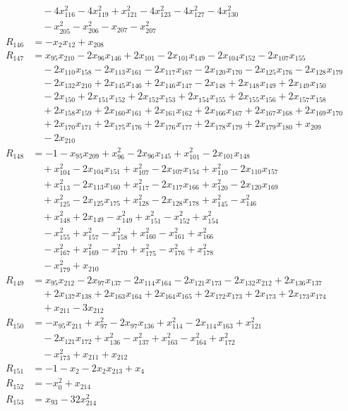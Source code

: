 \begin{align*}
&\quad{}-4x_{116}^{2}-4x_{119}^{2}+x_{121}^{2}-4x_{123}^{2}-4x_{127}^{2}-4x_{130}^{2}\\
&\quad{}-x_{205}^{2}-x_{206}^{2}-x_{207}-x_{207}^{2}\\
R_{146}&=-x_{2}x_{12}+x_{208}\\
R_{147}&=x_{95}x_{210}-2x_{96}x_{146}+2x_{101}-2x_{101}x_{149}-2x_{104}x_{152}-2x_{107}x_{155}\\
&\quad{}-2x_{110}x_{158}-2x_{113}x_{161}-2x_{117}x_{167}-2x_{120}x_{170}-2x_{125}x_{176}-2x_{128}x_{179}\\
&\quad{}-2x_{132}x_{210}+2x_{145}x_{146}+2x_{146}x_{147}-2x_{148}+2x_{148}x_{149}+2x_{149}x_{150}\\
&\quad{}-2x_{150}+2x_{151}x_{152}+2x_{152}x_{153}+2x_{154}x_{155}+2x_{155}x_{156}+2x_{157}x_{158}\\
&\quad{}+2x_{158}x_{159}+2x_{160}x_{161}+2x_{161}x_{162}+2x_{166}x_{167}+2x_{167}x_{168}+2x_{169}x_{170}\\
&\quad{}+2x_{170}x_{171}+2x_{175}x_{176}+2x_{176}x_{177}+2x_{178}x_{179}+2x_{179}x_{180}+x_{209}\\
&\quad{}-2x_{210}\\
R_{148}&=-1-x_{95}x_{209}+x_{96}^{2}-2x_{96}x_{145}+x_{101}^{2}-2x_{101}x_{148}\\
&\quad{}+x_{104}^{2}-2x_{104}x_{151}+x_{107}^{2}-2x_{107}x_{154}+x_{110}^{2}-2x_{110}x_{157}\\
&\quad{}+x_{113}^{2}-2x_{113}x_{160}+x_{117}^{2}-2x_{117}x_{166}+x_{120}^{2}-2x_{120}x_{169}\\
&\quad{}+x_{125}^{2}-2x_{125}x_{175}+x_{128}^{2}-2x_{128}x_{178}+x_{145}^{2}-x_{146}^{2}\\
&\quad{}+x_{148}^{2}+2x_{149}-x_{149}^{2}+x_{151}^{2}-x_{152}^{2}+x_{154}^{2}\\
&\quad{}-x_{155}^{2}+x_{157}^{2}-x_{158}^{2}+x_{160}^{2}-x_{161}^{2}+x_{166}^{2}\\
&\quad{}-x_{167}^{2}+x_{169}^{2}-x_{170}^{2}+x_{175}^{2}-x_{176}^{2}+x_{178}^{2}\\
&\quad{}-x_{179}^{2}+x_{210}\\
R_{149}&=x_{95}x_{212}-2x_{97}x_{137}-2x_{114}x_{164}-2x_{121}x_{173}-2x_{132}x_{212}+2x_{136}x_{137}\\
&\quad{}+2x_{137}x_{138}+2x_{163}x_{164}+2x_{164}x_{165}+2x_{172}x_{173}+2x_{173}+2x_{173}x_{174}\\
&\quad{}+x_{211}-3x_{212}\\
R_{150}&=-x_{95}x_{211}+x_{97}^{2}-2x_{97}x_{136}+x_{114}^{2}-2x_{114}x_{163}+x_{121}^{2}\\
&\quad{}-2x_{121}x_{172}+x_{136}^{2}-x_{137}^{2}+x_{163}^{2}-x_{164}^{2}+x_{172}^{2}\\
&\quad{}-x_{173}^{2}+x_{211}+x_{212}\\
R_{151}&=-1-x_{2}-2x_{2}x_{213}+x_{4}\\
R_{152}&=-x_{0}^{2}+x_{214}\\
R_{153}&=x_{93}-32x_{214}^{2}\\
\end{align*}
\endgroup
